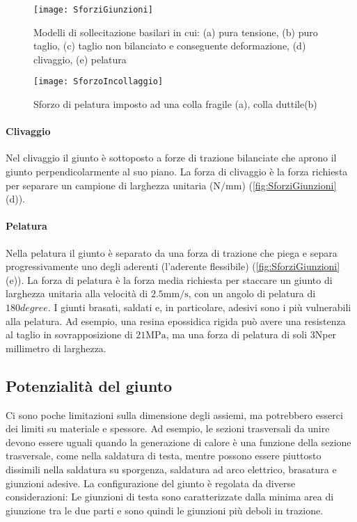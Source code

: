 \begin{figure}
\centering
\texttt{[image: SforziGiunzioni]}
\caption{Modelli di sollecitazione basilari in cui: (a) pura tensione, (b) puro taglio, (c) taglio non bilanciato e conseguente deformazione, (d) clivaggio, (e) pelatura}
\label{fig:SforziGiunzioni}
\texttt{[image: SforzoIncollaggio]}
\caption{Sforzo di pelatura imposto ad una colla fragile (a), colla duttile(b)}
\label{fig:SforzoIncollaggio}
\end{figure}

\paragraph{Clivaggio}
Nel clivaggio il giunto è sottoposto a forze di trazione bilanciate che aprono il giunto perpendicolarmente al suo piano. La forza di clivaggio è la forza richiesta per separare un campione di larghezza unitaria ($\unit{\N/\mm}$) (\ref{fig:SforziGiunzioni} (d)).
\paragraph{Pelatura}
Nella pelatura il giunto è separato da una forza di trazione che piega e separa progressivamente uno degli aderenti (l'aderente flessibile) (\ref{fig:SforziGiunzioni} (e)).
La forza di pelatura è la forza media richiesta per staccare un giunto di larghezza unitaria alla velocità di $2.5\unit{\mm/\s}$, con un angolo di pelatura di $180\unit{degree}$.
I giunti brasati, saldati e, in particolare, adesivi sono i più vulnerabili alla pelatura. Ad esempio, una resina epossidica rigida può avere una resistenza al taglio in sovrapposizione di $21\unit{\MPa}$, ma una forza di pelatura di soli $3 \unit{\N}$per millimetro di larghezza.

\subsection{Potenzialità del giunto}
Ci sono poche limitazioni sulla dimensione degli assiemi, ma potrebbero esserci dei limiti su materiale e spessore. Ad esempio, le sezioni trasversali da unire devono essere uguali quando la generazione di calore è una funzione della sezione trasversale, come nella saldatura di testa, mentre possono essere piuttosto dissimili nella saldatura su sporgenza, saldatura ad arco elettrico, brasatura e giunzioni adesive.
La configurazione del giunto è regolata da diverse considerazioni:
Le giunzioni di testa sono caratterizzate dalla minima area di giunzione tra le due parti e sono quindi le giunzioni più deboli in trazione.

